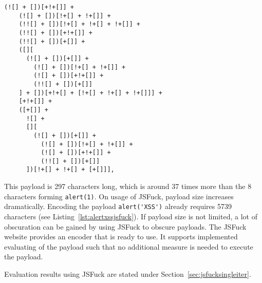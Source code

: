 \begin{lstlisting}[style=basicStyle, caption=alert(1) in JSFuck, label={lst:alert1jsfuck}]
  (![] + [])[+!+[]] +
    (![] + [])[!+[] + !+[]] +
    (!![] + [])[!+[] + !+[] + !+[]] +
    (!![] + [])[+!+[]] +
    (!![] + [])[+[]] +
    ([][
      (![] + [])[+[]] +
        (![] + [])[!+[] + !+[]] +
        (![] + [])[+!+[]] +
        (!![] + [])[+[]]
    ] + [])[+!+[] + [!+[] + !+[] + !+[]]] +
    [+!+[]] +
    ([+[]] +
      ![] +
      [][
        (![] + [])[+[]] +
          (![] + [])[!+[] + !+[]] +
          (![] + [])[+!+[]] +
          (!![] + [])[+[]]
      ])[!+[] + !+[] + [+[]]],
\end{lstlisting}
This payload is 297 characters long, which is around 37 times more than the 8 characters forming \verb|alert(1)|. On usage of JSFuck, payload size increases dramatically. Encoding the payload \verb|alert('XSS')| already requires 5739 characters (see Listing~\ref{lst:alertxssjsfuck}). If payload size is not limited, a lot of obscuration can be gained by using JSFuck to obscure payloads. The JSFuck website provides an encoder that is ready to use. It supports implemented evaluating of the payload such that no additional measure is needed to execute the payload. \cite{mk/jsfuck}

Evaluation results using JSFuck are stated under Section~\ref{sec:jsfucksingleiter}.

